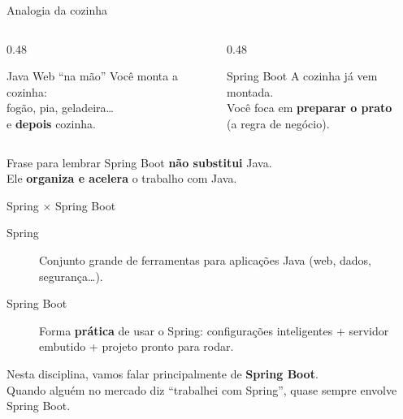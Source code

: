 \documentclass[aspectratio=169,11pt]{beamer}
\begin{document}
\begin{frame}{Analogia da cozinha}
  \begin{columns}[T]
    \begin{column}{0.48\textwidth}
      \begin{block}{Java Web ``na mão''}
        Você monta a cozinha:\\
        fogão, pia, geladeira\ldots\\
        e \textbf{depois} cozinha.
      \end{block}
    \end{column}
    \begin{column}{0.48\textwidth}
      \begin{block}{Spring Boot}
        A cozinha já vem montada.\\
        Você foca em \textbf{preparar o prato}\\
        (a regra de negócio).
      \end{block}
    \end{column}
  \end{columns}

  \vspace{1em}
  \begin{alertblock}{Frase para lembrar}
    Spring Boot \textbf{não substitui} Java.\\
    Ele \textbf{organiza e acelera} o trabalho com Java.
  \end{alertblock}
\end{frame}

\begin{frame}{Spring $\times$ Spring Boot}
  \begin{description}
    \item[Spring] Conjunto grande de ferramentas para aplicações Java
      (web, dados, segurança\ldots).
    \item[Spring Boot] Forma \textbf{prática} de usar o Spring:
      configurações inteligentes + servidor embutido + projeto pronto para rodar.
  \end{description}

  \vspace{0.8em}
  Nesta disciplina, vamos falar principalmente de \textbf{Spring Boot}.\\
  Quando alguém no mercado diz “trabalhei com Spring”, quase sempre
  envolve Spring Boot.
\end{frame}
\end{document}

